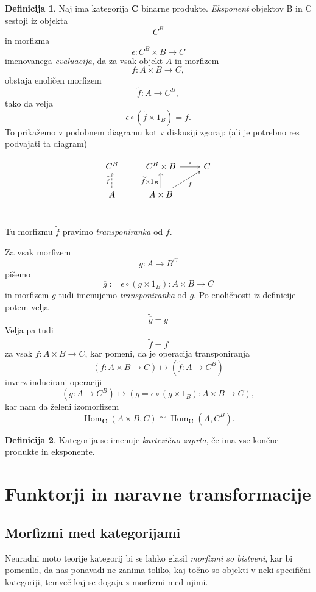 \documentclass[12pt,a4paper]{book}
\theoremstyle{definition}
\newtheorem{definicija}{Definicija}[chapter]
\theoremstyle{plain}
\theoremstyle{definition}
\theoremstyle{remark}
\newcommand{\cat}[1]{\textbf{#1}}
\DeclareMathOperator{\Hom}{Hom}
\begin{document}
\begin{definicija}
Naj ima kategorija $\cat{C}$ binarne produkte. \emph{Eksponent} objektov B in C sestoji iz objekta 
$$C^B$$
in morfizma
$$\epsilon : C^B \times B \to C$$ imenovanega \emph{evaluacija}, da za vsak objekt $A$ in morfizem 
$$f : A \times B \to C,$$
obstaja enoličen morfizem 
$$\widetilde{f} : A \to C^B,$$
tako da velja
$$\epsilon \circ (\widetilde{f} \times 1_B) = f.$$
To prikažemo v podobnem diagramu kot v diskusiji zgoraj: (ali je potrebno res podvajati ta diagram)

$$\begin{tikzcd}
C^B &  C^B \times B \ar[r, "\epsilon"] & C \\
A \ar[u, dashed, "\widetilde{f}"] &  A \times B \ar[u, "\widetilde{f} \times 1_B"] \ar[ur, "f"'] & \\
\end{tikzcd}$$

Tu morfizmu $\widetilde{f}$ pravimo \emph{transponiranka} od $f$.
\end{definicija}

Za vsak morfizem $$g : A \to B^C$$ pišemo
$$ \overline{g} := \epsilon \circ (g \times 1_B) : A \times B \to C$$
in morfizem $\overline{g}$ tudi imenujemo \emph{transponiranka} od $g$. Po enoličnosti iz definicije potem velja
$$\widetilde{\overline{g}} = g$$
Velja pa tudi
$$\overline{\widetilde{f}} = f$$
za vsak $f : A \times B \to C$, kar pomeni, da je operacija transponiranja
$$(f : A \times B \to C) \mapsto (\widetilde{f} : A \to C^B)$$
inverz inducirani operaciji
$$(g : A \to C^B) \mapsto (\overline{g} = \epsilon \circ (g \times 1_B) : A \times B \to C),$$
kar nam da želeni izomorfizem
$$\Hom_{\cat{C}}(A \times B, C) \cong \Hom_{\cat{C}}(A, C^B).$$

\begin{definicija}
Kategorija se imenuje \emph{kartezično zaprta}, če ima vse končne produkte in eksponente.
\end{definicija}

\section{Funktorji in naravne transformacije}

\subsection{Morfizmi med kategorijami}

Neuradni moto teorije kategorij bi se lahko glasil \emph{morfizmi so bistveni},
kar bi pomenilo, da nas ponavadi ne zanima toliko, kaj točno so objekti v neki specifični kategoriji, temveč kaj se dogaja z morfizmi med njimi.
\end{document}
